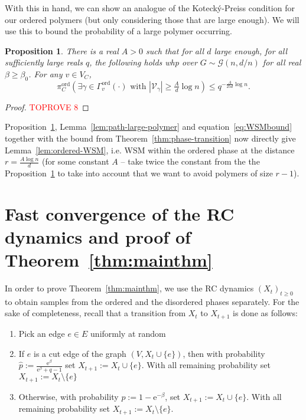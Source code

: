 \documentclass[11pt]{article}
\theoremstyle{plain}
\newtheorem{proposition}[theorem]{Proposition}
\newcommand{\G}{\mathcal{G}}
\newcommand{\emm}{\mathrm{e}}
\newcommand{\V}{\mathcal{V}}
\newcommand{\Vin}{\V_\gamma}
\newcommand{\1}{\mathbb{1}}
\newcommand{\ord}{\mathrm{ord}}
\begin{document}
With this in hand, we can show an analogue of the Koteck\'y-Preiss condition for our ordered polymers (but only considering those that are large enough).
We will use this to   bound the probability of a large polymer occurring.

\begin{proposition}\label{prop:no-large-ordered-polymer}
    There is a real  \(A > 0\) such that for all \(d\) large enough, for all sufficiently large reals $q$, the following holds whp over \(G\sim\G(n,d/n)\) for all real \(\beta \geq \beta_0\). For any \(v\in V_C\),
    \[
    \pi^\ord_C(\exists \gamma\in\Gamma^\ord_v(\cdot) \text{ with } |\Vin|\geq \tfrac{A}{d}\log n) \leq q^{-\frac{A}{25d}\log n}.
    \]
\end{proposition}
\begin{proof}\textcolor{red}{TOPROVE 8}\end{proof}

Proposition~\ref{prop:no-large-ordered-polymer}, Lemma~\ref{lem:path-large-polymer} and equation~\eqref{eq:WSMbound} together with the bound from Theorem~\ref{thm:phase-transition} now directly give Lemma~\ref{lem:ordered-WSM}, i.e. WSM within the ordered phase at the distance \(r = \frac{A\log n}{d}\) (for some constant \(A\) -- take twice the constant from the the Proposition~\ref{prop:no-large-ordered-polymer} to take into account that we want to avoid polymers of size \(r - 1\)).

\section{Fast convergence of the RC dynamics and proof of Theorem~\ref{thm:mainthm}}\label{sec:RCdynamics}
In order to prove  Theorem~\ref{thm:mainthm}, we use the  RC dynamics $(X_t)_{t\geq 0}$ to obtain samples from the ordered and the disordered phases separately. For the sake of completeness, recall that a transition from \(X_t\) to \(X_{t+1}\) is done as follows:
\begin{enumerate}[(1)]
    \item Pick an edge \(e\in E\) uniformly at random
    \item If \(e\) is a cut edge of the graph \((V,X_t\cup\{e\})\), then with probability \(\hat p := \frac{\emm^\beta}{\emm^\beta+q-1}\) set \(X_{t+1} := X_t\cup \{e\}\). With all remaining probability set \(X_{t+1} := X_t \setminus \{e\}\)
    \item Otherwise, with probability \(p := 1-\emm^{-\beta}\), set \(X_{t+1} := X_t\cup\{e\}\). With all remaining probability set \(X_{t+1} := X_t \setminus \{e\}\).
\end{enumerate}
\end{document}
